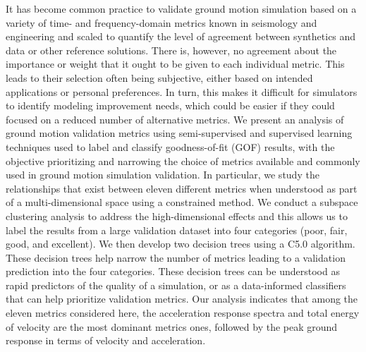 % 
It has become common practice to validate ground motion simulation based on a variety of time- and frequency-domain metrics known in seismology and engineering and scaled to quantify the level of agreement between synthetics and data or other reference solutions. There is, however, no agreement about the importance or weight that it ought to be given to each individual metric. This leads to their selection often being subjective, either based on intended applications or personal preferences. In turn, this makes it difficult for simulators to identify modeling improvement needs, which could be easier if they could focused on a reduced number of alternative metrics. We present an analysis of ground motion validation metrics using semi-supervised and supervised learning techniques used to label and classify  goodness-of-fit (GOF) results, with the objective prioritizing and narrowing the choice of metrics available and commonly used in ground motion simulation validation. In particular, we study the relationships that exist between eleven different metrics when understood as part of a multi-dimensional space using a constrained \kmeans{} method. We conduct a subspace clustering analysis to address the high-dimensional effects and this allows us to label the results from a large validation dataset into four categories (poor, fair, good, and excellent). We then develop two decision trees using a C5.0 algorithm. These decision trees help narrow the number of metrics leading to a validation prediction into the four categories. These decision trees can be understood as rapid predictors of the quality of a simulation, or as a data-informed classifiers that can help prioritize validation metrics. Our analysis indicates that among the eleven metrics considered here, the acceleration response spectra and total energy of velocity are the most dominant metrics ones, followed by the peak ground response in terms of velocity and acceleration.

